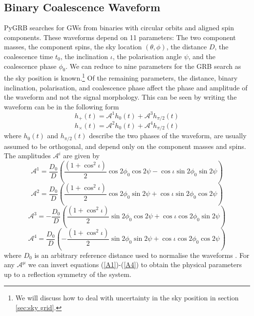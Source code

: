 \documentclass[11pt]{cuthesis}
\begin{document}
\subsection{Binary Coalescence Waveform} \label{sec:binary wf}
PyGRB searches for GWs from binaries with circular orbits and aligned spin components. These waveforms depend on 11 parameters: The two component masses, the component spins, the sky location $(\theta, \phi)$, the distance $D$, the coalescence time $t_0$, the inclination $\iota$, the polarisation angle $\psi$, and the coalescence phase $\phi_0$. We can reduce to nine parameters for the GRB search as the sky position is known.\footnote{We will discuss how to deal with uncertainty in the sky position in section \ref{sec:sky grid}.} Of the remaining parameters, the distance, binary inclination, polarisation, and coalescence phase affect the phase and amplitude of the waveform and not the signal morphology. This can be seen by writing the waveform can be in the following form
\begin{equation} \label{hp}
h_+(t) = \mathcal{A}^1 h_0(t) + \mathcal{A}^3 h_{\pi/2}(t)
\end{equation}
\begin{equation} \label{hx}
h_\times(t) = \mathcal{A}^2 h_0(t) + \mathcal{A}^4 h_{\pi/2}(t)
\end{equation}
where $h_0(t)$ and $h_{\pi/2}(t)$ describe the two phases of the waveform, are usually assumed to be orthogonal, and depend only on the component masses and spins. The amplitudes $\mathcal{A}^i$ are given by 
\begin{equation} \label{A1}
\mathcal{A}^1 = \frac{D_0}{D} \left( \frac{(1+\cos^2 \iota)}{2} \cos 2\phi_0 \cos 2\psi -  \cos \iota \sin 2 \phi_0 \sin 2\psi \right)
\end{equation}
\begin{equation}
\mathcal{A}^2 = \frac{D_0}{D} \left( \frac{(1+\cos^2 \iota)}{2} \cos 2\phi_0 \sin 2\psi +  \cos \iota \sin 2 \phi_0 \cos 2\psi \right)
\end{equation}
\begin{equation}
\mathcal{A}^3 = -\frac{D_0}{D} \left( \frac{(1+\cos^2 \iota)}{2} \sin 2\phi_0 \cos 2\psi +  \cos \iota \cos 2 \phi_0 \sin 2\psi \right)
\end{equation}
\begin{equation} \label{A4}
\mathcal{A}^4 = \frac{D_0}{D} \left( -\frac{(1+\cos^2 \iota)}{2} \sin 2\phi_0 \sin 2\psi +  \cos \iota \cos 2 \phi_0 \cos 2\psi \right)
\end{equation}
where $D_0$ is an arbitrary reference distance used to normalise the waveforms \cite{pygrb_harry} \cite{Cornish_2007}. For any $\mathcal{A}^\mu$ we can invert equations (\ref{A1})-(\ref{A4}) to obtain the physical parameters up to a reflection symmetry of the system.
\end{document}
